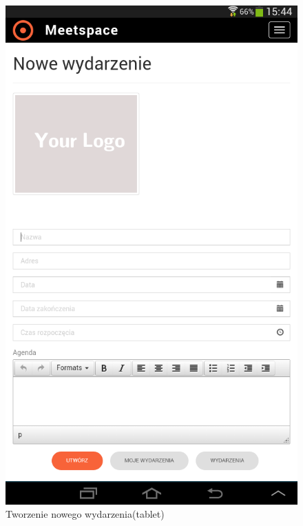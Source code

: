     \begin{figure}
      \centering
      \includegraphics[scale=0.5]{images/new_event_tablet.png}
      \caption{Tworzenie nowego wydarzenia(tablet)}
    \end{figure}

